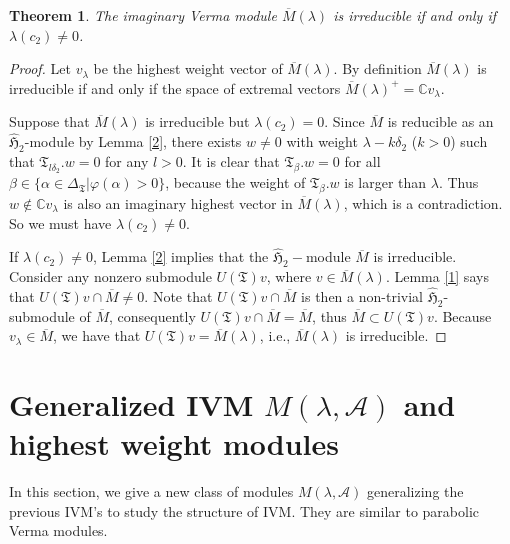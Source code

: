 \documentclass[11pt]{amsproc}
\newtheorem{theorem}{Theorem}[section]
\theoremstyle{definition}
\theoremstyle{remark}
\numberwithin{equation}{section} \errorcontextlines=0
\begin{document}
\begin{theorem}\label{T:crierion}
The imaginary Verma module $\overline{M}(\lambda)$ is irreducible if
and only if $\lambda(c_2)\neq 0$.
\end{theorem}
\begin{proof} Let $v_{\lambda}$ be the highest weight vector
of $\overline{M}({\lambda})$. By definition $\overline{M}(\lambda)$ is irreducible if and only if
the space of extremal vectors $\overline{M}(\lambda)^+=\mathbb C v_{\lambda}$.

Suppose that $\overline{M}(\lambda)$ is irreducible but
$\lambda(c_2)= 0$. Since $\overline{M}$ is reducible as an
$\hat{\mathfrak{H}}_2$-module by Lemma \ref {2}, there exists $w\neq
0$ with weight $\lambda-k\delta_2$ ($k>0$) such that $\mathfrak
T_{l\delta_2}.w=0$ for any $l>0$. It is clear that $\mathfrak
T_{\beta}.w=0$ for all $\beta\in \{\alpha\in\Delta_{\mathfrak
T}|\varphi(\alpha)> 0\}$, because the weight of $\mathfrak
T_{\beta}.w$ is larger than ${\lambda}$. Thus
$w\notin \mathbb Cv_{\lambda}$ is also an imaginary highest vector
in $\overline{M}(\lambda)$, which is a contradiction.
 So we must have $\lambda(c_2)\neq 0$.

If $\lambda(c_2)\neq 0$, Lemma \ref {2} implies that the
$\hat{\mathfrak{H}}_2-$module $\overline{M}$ is irreducible.
Consider any nonzero submodule $U(\mathfrak T)v$, where $v\in
\overline{M}(\lambda)$. Lemma \ref {1} says that $U(\mathfrak
T)v\cap \overline{M}\neq 0$. Note that $U(\mathfrak T)v\cap
\overline{M}$ is then a non-trivial $\hat{\mathfrak{H}}_2$-submodule
of $\overline{M}$, consequently $U(\mathfrak T)v\cap
\overline{M}=\overline{M}$, thus $\overline{M}\subset U(\mathfrak
T)v$. Because $v_{\lambda}\in\overline{M}$, we have that $U(\mathfrak
T)v=\overline{M}(\lambda)$, i.e., $\overline{M}(\lambda)$ is
irreducible.\end{proof}

\section{Generalized IVM $M(\lambda,\mathcal {A})$ and highest weight modules}
In this section, we give a new class of modules $M(\lambda,\mathcal
{A})$ generalizing the previous IVM's to study the structure of IVM.
They are similar to parabolic Verma modules.
\end{document}
